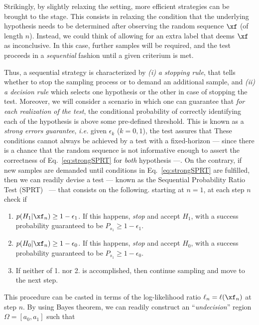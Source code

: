 Strikingly, by slightly relaxing the setting, more efficient strategies can be brought to the stage. This consists in relaxing the condition that the underlying hypothesis needs to be determined after observing the random sequence $\xf$ (of length $n$). Instead, we could think of allowing for an extra label that deems $\xf$ as inconclusive. In this case, further samples will be required, and the test proceeds in a \textit{sequential} fashion until a given criterium is met.

Thus, a sequential strategy is characterized by \textit{(i)} \textit{a stopping rule}, that tells whether to stop the sampling process or to demand an additional sample, and \textit{(ii)} \textit{a decision rule} which selects one hypothesis or the other in case of stopping the test. Moreover, we will consider a scenario in which one can guarantee that \textit{for each realization of the test}, the conditional probability of correctly identifying each of the hypothesis is above some pre-defined threshold. This is known as a \textit{strong errors guarantee}, \textit{i.e.} given $\epsilon_k$ ($k=0,1$), the test assures that
These conditions cannot always be achieved by a test with a fixed-horizon --- since there is a chance that the random sequence is not informative enough to assert the correctness of Eq.~\ref{eq:strongSPRT} for \textit{both} hypothesis ---. On the contrary, if new samples are demanded until conditions in Eq.~\ref{eq:strongSPRT} are fulfilled, then we can readily devise a test --- known as the Sequential Probability Ratio Test (SPRT)~\cite{Wald1948Optimum} --- that consists on the following.  starting at $n=1$, at each step $n$ check if
\begin{enumerate}
\item $p(H_1|\xf_n) \geq 1-\epsilon_1$. If this happens, \textit{stop} and accept $H_1$, with a success probability guaranteed to be $P_{s_1} \geq 1-\epsilon_1$.
\item $p(H_0|\xf_n) \geq 1-\epsilon_0$. If this happens, \textit{stop} and accept $H_0$, with a success probability guaranteed to be $P_{s_1} \geq 1-\epsilon_0$.
\item If neither of 1. nor 2. is accomplished, then continue sampling and move to the next step.
\end{enumerate}
This procedure can be casted in terms of the log-likelihood ratio $\ell_n = \ell(\xf_n)$ at step $n$. By using Bayes theorem, we can readily construct an ``\textit{undecision}'' region $\Omega = [a_0, a_1]$ such that
